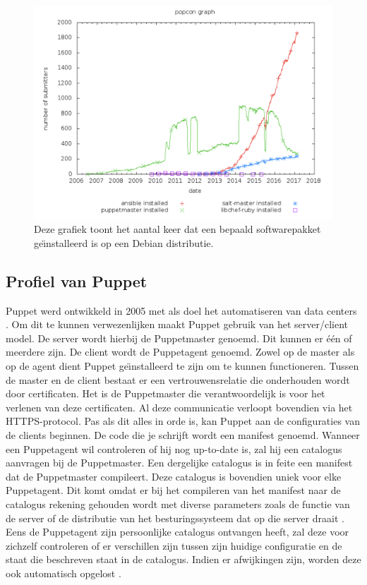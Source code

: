 \begin{figure}
  \includegraphics[width=\linewidth]{img/popcon_everybody.png}
  \caption{Deze grafiek toont het aantal keer dat een bepaald softwarepakket ge\"{\i}nstalleerd is op een Debian distributie. \autocite{popcon}}
  \label{fig:popcon_everybody}
\end{figure}

\subsection{Profiel van Puppet}

Puppet werd ontwikkeld in 2005 met als doel het automatiseren van data centers \autocite{puppetfaq}. Om dit te kunnen verwezenlijken maakt Puppet gebruik van  het server/client model. De server wordt hierbij de Puppetmaster genoemd. Dit kunnen er   \'e\'en of meerdere zijn. De client wordt de Puppetagent genoemd. Zowel op de master als op de agent dient Puppet ge{\"\i}nstalleerd te zijn om te kunnen functioneren. Tussen de master en de client bestaat er een vertrouwensrelatie die onderhouden wordt door certificaten. Het is de Puppetmaster die verantwoordelijk is voor het verlenen van deze certificaten. Al deze communicatie verloopt bovendien via het HTTPS-protocol. Pas als dit alles in orde is, kan Puppet  aan de configuraties van de clients beginnen. De code die je schrijft wordt een manifest genoemd. Wanneer een Puppetagent wil controleren of hij nog up-to-date is, zal hij een catalogus aanvragen bij de Puppetmaster. Een dergelijke catalogus is in feite een manifest dat de Puppetmaster compileert. Deze catalogus is bovendien uniek voor elke Puppetagent. Dit komt omdat er bij het compileren van het manifest naar de catalogus rekening gehouden wordt met diverse parameters zoals de functie van de server of de distributie van het besturingssysteem dat op die server draait \autocite{Puppetlanguagecatalog}. Eens de Puppetagent zijn persoonlijke catalogus ontvangen heeft, zal deze voor zichzelf controleren of er verschillen zijn tussen zijn huidige configuratie en de staat die beschreven staat in de catalogus. Indien er afwijkingen zijn, worden deze ook automatisch opgelost \autocite{Puppetdoc}.



